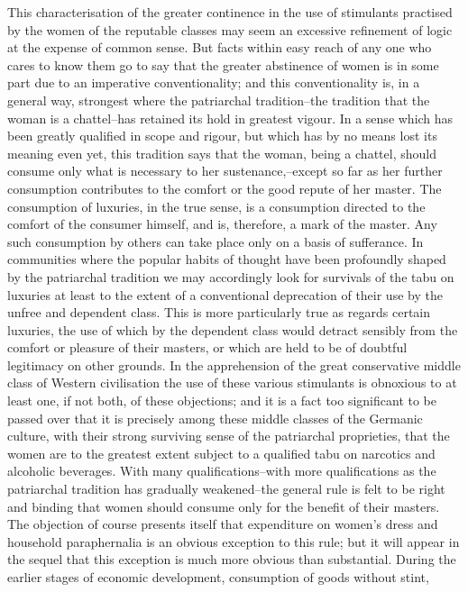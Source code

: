 \documentclass[12pt]{report}
\begin{document}
This characterisation of the greater continence in the use of stimulants
practised by the women of the reputable classes may seem an excessive
refinement of logic at the expense of common sense. But facts within
easy reach of any one who cares to know them go to say that the
greater abstinence of women is in some part due to an imperative
conventionality; and this conventionality is, in a general way,
strongest where the patriarchal tradition--the tradition that the woman
is a chattel--has retained its hold in greatest vigour. In a sense which
has been greatly qualified in scope and rigour, but which has by no
means lost its meaning even yet, this tradition says that the
woman, being a chattel, should consume only what is necessary to her
sustenance,--except so far as her further consumption contributes to the
comfort or the good repute of her master. The consumption of luxuries,
in the true sense, is a consumption directed to the comfort of the
consumer himself, and is, therefore, a mark of the master. Any such
consumption by others can take place only on a basis of sufferance. In
communities where the popular habits of thought have been profoundly
shaped by the patriarchal tradition we may accordingly look for
survivals of the tabu on luxuries at least to the extent of a
conventional deprecation of their use by the unfree and dependent class.
This is more particularly true as regards certain luxuries, the use of
which by the dependent class would detract sensibly from the comfort
or pleasure of their masters, or which are held to be of doubtful
legitimacy on other grounds. In the apprehension of the great
conservative middle class of Western civilisation the use of these
various stimulants is obnoxious to at least one, if not both, of these
objections; and it is a fact too significant to be passed over that it
is precisely among these middle classes of the Germanic culture, with
their strong surviving sense of the patriarchal proprieties, that
the women are to the greatest extent subject to a qualified tabu on
narcotics and alcoholic beverages. With many qualifications--with more
qualifications as the patriarchal tradition has gradually weakened--the
general rule is felt to be right and binding that women should consume
only for the benefit of their masters. The objection of course presents
itself that expenditure on women's dress and household paraphernalia is
an obvious exception to this rule; but it will appear in the sequel that
this exception is much more obvious than substantial. During the earlier
stages of economic development, consumption of goods without stint,
\end{document}
